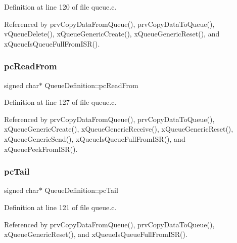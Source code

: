 Definition at line 120 of file queue.\+c.



Referenced by prv\+Copy\+Data\+From\+Queue(), prv\+Copy\+Data\+To\+Queue(), v\+Queue\+Delete(), x\+Queue\+Generic\+Create(), x\+Queue\+Generic\+Reset(), and x\+Queue\+Is\+Queue\+Full\+From\+I\+S\+R().

\mbox{\label{structQueueDefinition_a6fd0b7b0b51bb9654cdf0899bdaa4936}} 
\subsubsection{\texorpdfstring{pc\+Read\+From}{pcReadFrom}}
{\footnotesize\ttfamily signed char$\ast$ Queue\+Definition\+::pc\+Read\+From}



Definition at line 127 of file queue.\+c.



Referenced by prv\+Copy\+Data\+From\+Queue(), prv\+Copy\+Data\+To\+Queue(), x\+Queue\+Generic\+Create(), x\+Queue\+Generic\+Receive(), x\+Queue\+Generic\+Reset(), x\+Queue\+Generic\+Send(), x\+Queue\+Is\+Queue\+Full\+From\+I\+S\+R(), and x\+Queue\+Peek\+From\+I\+S\+R().

\mbox{\label{structQueueDefinition_a107296146c82cd122e0ba0756fb89c9d}} 
\subsubsection{\texorpdfstring{pc\+Tail}{pcTail}}
{\footnotesize\ttfamily signed char$\ast$ Queue\+Definition\+::pc\+Tail}



Definition at line 121 of file queue.\+c.



Referenced by prv\+Copy\+Data\+From\+Queue(), prv\+Copy\+Data\+To\+Queue(), x\+Queue\+Generic\+Reset(), and x\+Queue\+Is\+Queue\+Full\+From\+I\+S\+R().

\mbox{\label{structQueueDefinition_a019aa270dc6be4b3d0ea3f32e6730529}} 
